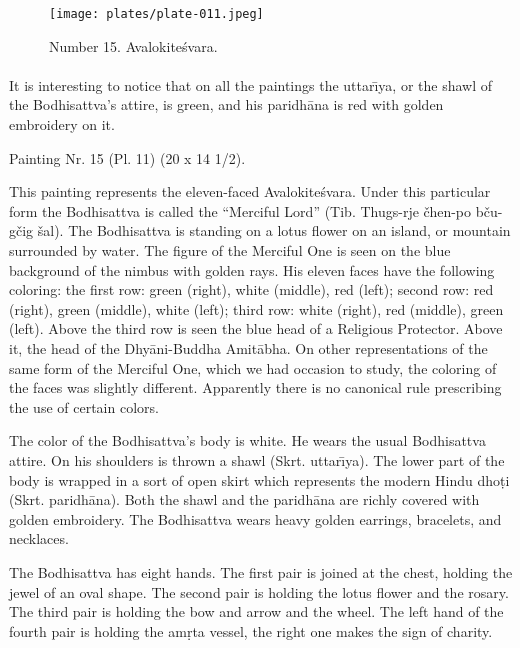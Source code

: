 \documentclass[a4paper, 12pt, oneside]{article}
\begin{document}
\clearpage
\begin{figure}[H]
\centering
\texttt{[image: plates/plate-011.jpeg]}
\caption*{Number 15. Avalokite\'{s}vara.}
\end{figure}
\clearpage
\paragraph{}
It is interesting to notice that on all the paintings the uttar\={\i}ya, or the shawl of the Bodhisattva's attire, is green, and his paridh\={a}na is red with golden embroidery on it.

\bigskip

Painting Nr. 15 (Pl. 11) (20 x 14 1/2).

\bigskip

This painting represents the eleven-faced Avalokite\'{s}vara. Under this particular form the Bodhisattva is called the ``Merciful Lord'' (Tib. Thugs-rje čhen-po bču-gčig šal). The Bodhisattva is standing on a lotus flower on an island, or mountain surrounded by water. The figure of the Merciful One is seen on the blue background of the nimbus with golden rays. His eleven faces have the following coloring: the first row: green (right), white (middle), red (left); second row: red (right), green (middle), white (left); third row: white (right), red (middle), green (left). Above the third row is seen the blue head of a Religious Protector. Above it, the head of the Dhy\={a}ni-Buddha Amit\={a}bha. On other representations of the same form of the Merciful One, which we had occasion to study, the coloring of the faces was slightly different. Apparently there is no canonical rule prescribing the use of certain colors.

The color of the Bodhisattva's body is white. He wears the usual Bodhisattva attire. On his shoulders is thrown a shawl (Skrt. uttar\={\i}ya). The lower part of the body is wrapped in a sort of open skirt which represents the modern Hindu dho\d{t}i (Skrt. paridh\={a}na). Both the shawl and the paridh\={a}na are richly covered with golden embroidery. The Bodhisattva wears heavy golden earrings, bracelets, and necklaces.

The Bodhisattva has eight hands. The first pair is joined at the chest, holding the jewel of an oval shape. The second pair is holding the lotus flower and the rosary. The third pair is holding the bow and arrow and the wheel. The left hand of the fourth pair is holding the am\d{r}ta vessel, the right one makes the sign of charity.
\end{document}
